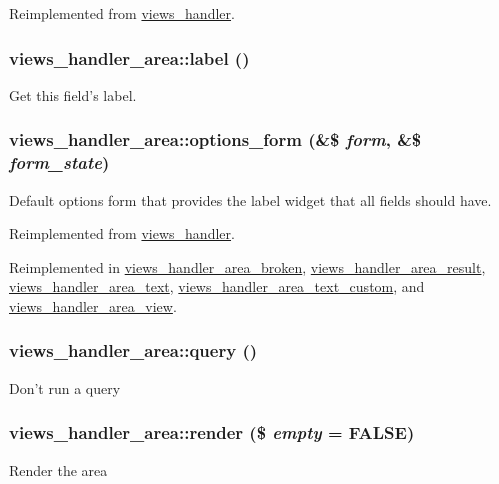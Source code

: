 Reimplemented from \hyperlink{classviews__handler_aa7df174ffa94ab095f7b9fdf154bcc30}{views\_\-handler}.\hypertarget{classviews__handler__area_ab6ca1a4a9766341b6159e8cad9945564}{
\subsubsection[{label}]{\setlength{\rightskip}{0pt plus 5cm}views\_\-handler\_\-area::label ()}}
\label{classviews__handler__area_ab6ca1a4a9766341b6159e8cad9945564}
Get this field's label. \hypertarget{classviews__handler__area_af3615e22fccc744485ddb7978ce812ff}{
\subsubsection[{options\_\-form}]{\setlength{\rightskip}{0pt plus 5cm}views\_\-handler\_\-area::options\_\-form (\&\$ {\em form}, \/  \&\$ {\em form\_\-state})}}
\label{classviews__handler__area_af3615e22fccc744485ddb7978ce812ff}
Default options form that provides the label widget that all fields should have. 

Reimplemented from \hyperlink{classviews__handler_aa41fcf16b177eb03e35facbae6320f74}{views\_\-handler}.

Reimplemented in \hyperlink{classviews__handler__area__broken_ac5f35dab0c0f8a2486e570fa8ec4e85a}{views\_\-handler\_\-area\_\-broken}, \hyperlink{classviews__handler__area__result_a8b6ec38182e50197cf1289acfac7b26e}{views\_\-handler\_\-area\_\-result}, \hyperlink{classviews__handler__area__text_a2781ce4797304f2ce2a026820e0006fb}{views\_\-handler\_\-area\_\-text}, \hyperlink{classviews__handler__area__text__custom_a93eb91b0ea21ca78b68b5a4832cc9035}{views\_\-handler\_\-area\_\-text\_\-custom}, and \hyperlink{classviews__handler__area__view_a6fd3e047a259d06d4fec77b0c286e9ed}{views\_\-handler\_\-area\_\-view}.\hypertarget{classviews__handler__area_a477f0103ba709a41a30d6e1765675b68}{
\subsubsection[{query}]{\setlength{\rightskip}{0pt plus 5cm}views\_\-handler\_\-area::query ()}}
\label{classviews__handler__area_a477f0103ba709a41a30d6e1765675b68}
Don't run a query \hypertarget{classviews__handler__area_a9f3eb4b8ee98a0929946e8de7253d302}{
\subsubsection[{render}]{\setlength{\rightskip}{0pt plus 5cm}views\_\-handler\_\-area::render (\$ {\em empty} = {\ttfamily FALSE})}}
\label{classviews__handler__area_a9f3eb4b8ee98a0929946e8de7253d302}
Render the area 

